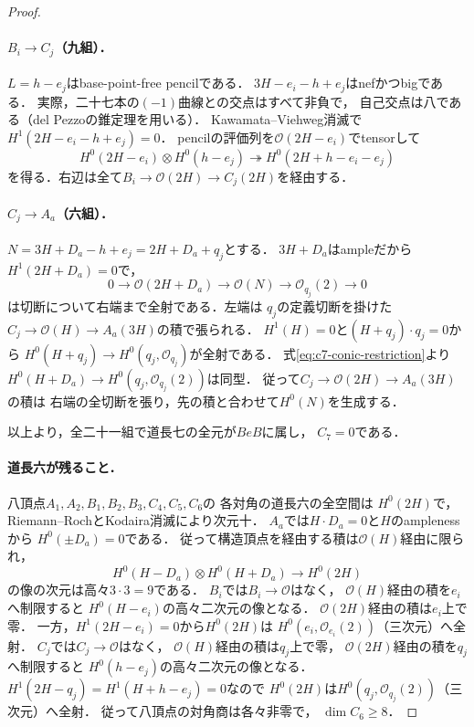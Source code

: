 \begin{proof}
\paragraph{$B_i\to C_j$（九組）．}
$L=h-e_j$はbase-point-free pencilである．
$3H-e_i-h+e_j$はnefかつbigである．
実際，二十七本の$(-1)$曲線との交点はすべて非負で，
自己交点は八である（del Pezzoの錐定理を用いる）．
Kawamata--Viehweg消滅で$H^1(2H-e_i-h+e_j)=0$．
pencilの評価列を$\mathcal O(2H-e_i)$でtensorして
\[
H^0(2H-e_i)\otimes H^0(h-e_j)
\twoheadrightarrow H^0(2H+h-e_i-e_j)
\]
を得る．右辺は全て$B_i\to\mathcal O(2H)\to C_j(2H)$を経由する．

\paragraph{$C_j\to A_a$（六組）．}
$N=3H+D_a-h+e_j=2H+D_a+q_j$とする．
$3H+D_a$はampleだから$H^1(2H+D_a)=0$で，
\[
0\to\mathcal O(2H+D_a)\to\mathcal O(N)
\to\mathcal O_{q_j}(2)\to0
\]
は切断について右端まで全射である．左端は
$q_j$の定義切断を掛けた
$C_j\to\mathcal O(H)\to A_a(3H)$の積で張られる．
$H^1(H)=0$と$(H+q_j)\cdot q_j=0$から
$H^0(H+q_j)\to H^0(q_j,\mathcal O_{q_j})$が全射である．
式\eqref{eq:c7-conic-restriction}より
$H^0(H+D_a)\to H^0(q_j,\mathcal O_{q_j}(2))$は同型．
従って$C_j\to\mathcal O(2H)\to A_a(3H)$の積は
右端の全切断を張り，先の積と合わせて$H^0(N)$を生成する．

以上より，全二十一組で道長七の全元が$BeB$に属し，
$C_7=0$である．

\paragraph{道長六が残ること．}
八頂点$A_1,A_2,B_1,B_2,B_3,C_4,C_5,C_6$の
各対角の道長六の全空間は
$H^0(2H)$で，Riemann--RochとKodaira消滅により次元十．
$A_a$では$H\cdot D_a=0$と$H$のamplenessから
$H^0(\pm D_a)=0$である．
従って構造頂点を経由する積は$\mathcal O(H)$経由に限られ，
\[
H^0(H-D_a)\otimes H^0(H+D_a)\longrightarrow H^0(2H)
\]
の像の次元は高々$3\cdot3=9$である．
$B_i$では$B_i\to\mathcal O$はなく，
$\mathcal O(H)$経由の積を$e_i$へ制限すると
$H^0(H-e_i)$の高々二次元の像となる．
$\mathcal O(2H)$経由の積は$e_i$上で零．
一方，$H^1(2H-e_i)=0$から$H^0(2H)$は
$H^0(e_i,\mathcal O_{e_i}(2))$（三次元）へ全射．
$C_j$では$C_j\to\mathcal O$はなく，
$\mathcal O(H)$経由の積は$q_j$上で零，
$\mathcal O(2H)$経由の積を$q_j$へ制限すると
$H^0(h-e_j)$の高々二次元の像となる．
$H^1(2H-q_j)=H^1(H+h-e_j)=0$なので
$H^0(2H)$は$H^0(q_j,\mathcal O_{q_j}(2))$（三次元）へ全射．
従って八頂点の対角商は各々非零で，
$\dim C_6\ge8$．
\end{proof}

